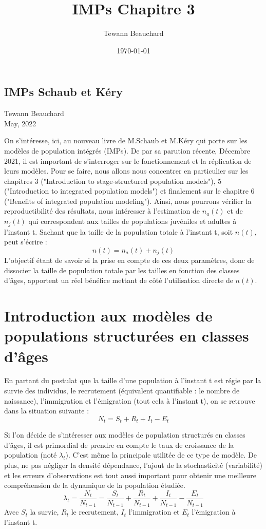 \documentclass[12pt,a4paper]{article}
\title{IMPs Chapitre 3}
\date{\today}
\author{Tewann Beauchard}
\begin{document}
\begin{center}
\section*{IMPs Schaub et Kéry}
\vspace*{1cm}
Tewann Beauchard \\
\vspace*{1cm}
May, 2022
\end{center}
\vspace*{1cm}

On s'intéresse, ici, au nouveau livre de M.Schaub et M.Kéry qui porte sur les modèles de population intégrés (IMPs). De par sa parution récente, Décembre 2021, il est important de s'interroger sur le fonctionnement et la réplication de leurs modèles. Pour se faire, nous allons nous concentrer en particulier sur les chapitres 3 ("Introduction to stage-structured population models"), 5 ("Introduction to integrated population models") et finalement sur le chapitre 6 ("Benefits of integrated population modeling"). Ainsi, nous pourrons vérifier la reproductibilité des résultats, nous intéresser à l'estimation de $n_{a}(t)$ et de $n_{j}(t)$ qui correspondent aux tailles de populations juvéniles et adultes à l'instant t. Sachant que la taille de la population totale à l'instant t, soit $n(t)$, peut s'écrire : $$n(t)= n_{a}(t) + n_{j}(t)$$L'objectif étant de savoir si la prise en compte de ces deux paramètres, donc de dissocier la taille de population totale par les tailles en fonction des classes d'âges, apportent un réel bénéfice mettant de côté l'utilisation directe de $n(t)$.

\section{Introduction aux modèles de populations structurées en classes d'âges}
En partant du postulat que la taille d'une population à l'instant t est régie par la survie des individus, le recrutement (équivalent quantifiable : le nombre de naissance), l'immigration et l'émigration (tout cela à l'instant t), on se retrouve dans la situation suivante : 
\begin{equation}
N_{t}=S_{t}+R_{t}+I_{t}-E_{t}
\end{equation}

Si l'on décide de s'intéresser aux modèles de population structurés en classes d'âges, il est primordial de prendre en compte le taux de croissance de la population (noté $\lambda_{t}$). C'est même la principale utilitée de ce type de modèle. De plus, ne pas négliger la densité dépendance, l'ajout de la stochasticité (variabilité) et les erreurs d'observations est tout aussi important pour obtenir une meilleure compréhension de la dynamique de la population étudiée.
\begin{equation}
\lambda_{t}=\dfrac{N_{t}}{N_{t-1}}=\dfrac{S_{t}}{N_{t-1}}+\dfrac{R_{t}}{N_{t-1}}+\dfrac{I_{t}}{N_{t-1}}-\dfrac{E_{t}}{N_{t-1}}
\end{equation}
Avec $S_{t}$ la survie, $R_{t}$ le recrutement, $I_{t}$ l'immigration et $E_{t}$ l'émigration à l'instant t.
\end{document}

